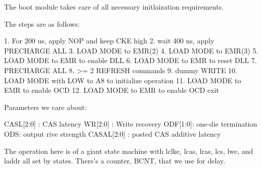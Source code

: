 The boot module takes care of all necessary initlaization requirements. 

The steps are as follows:

1. For 200 us, apply NOP and keep CKE high
2. wait 400 ns, apply PRECHARGE ALL
3. LOAD MODE to EMR(2)
4. LOAD MODE to EMR(3)
5. LOAD MODE to EMR to enable DLL
6. LOAD MODE to EMR to reset DLL
7. PRECHARGE ALL
8. >= 2 REFRESH commands
9. dummy WRITE
10. LOAD MODE with LOW to A8 to initialize operation
11. LOAD MODE to EMR to enable OCD
12. LOAD MODE to EMR to enable OCD exit

Parameters we care about: 

CASL[2:0] : CAS latency
WR[2:0] : Write recovery
ODF[1:0]: one-die termination
ODS: output rive strength
CASAL[2:0] : posted CAS additive latency


The operation here is of a giant state machine with lclke, lcas, lras,
lcs, lwe, and laddr all set by states. There's a counter, BCNT, that
we use for delay.

